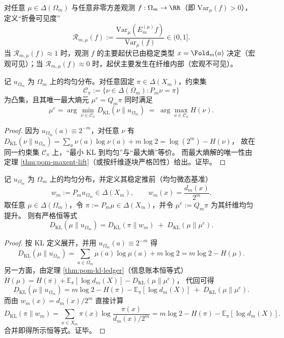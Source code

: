\begin{definition}\label{def:pom-fold-visibility}
对任意 $\mu\in\Delta(\Omega_m)$ 与任意非零方差观测 $f:\Omega_m\to\RR$（即 $\mathrm{Var}_\mu(f)>0$），定义“折叠可见度”
\[
\mathcal{R}_{m,\mu}(f):=\frac{\mathrm{Var}_\mu(E_m^{(\mu)}f)}{\mathrm{Var}_\mu(f)}\in(0,1].
\]
当 $\mathcal{R}_{m,\mu}(f)\approx 1$ 时，观测 $f$ 的主要起伏已由稳定类型 $x=\Fold_m(a)$ 决定（宏观可见）；当 $\mathcal{R}_{m,\mu}(f)\approx 0$ 时，起伏主要发生在纤维内部（宏观不可见）。
\end{definition}

\begin{corollary}\label{cor:pom-Iproj-maxent}
记 $u_{\Omega_m}$ 为 $\Omega_m$ 上的均匀分布。对任意固定 $\pi\in\Delta(X_m)$，约束集
\[
\mathcal{C}_\pi:=\{\nu\in\Delta(\Omega_m):P_m\nu=\pi\}
\]
为凸集，且其唯一最大熵元 $\mu^e=Q_m\pi$ 同时满足
\[
\boxed{\;
\mu^e=\arg\min_{\nu\in\mathcal{C}_\pi}D_{\mathrm{KL}}(\nu\|u_{\Omega_m})
\;=\;
\arg\max_{\nu\in\mathcal{C}_\pi}H(\nu).
\;}
\]
\end{corollary}
\begin{proof}
因为 $u_{\Omega_m}(a)\equiv 2^{-m}$，对任意 $\nu$ 有
\(
D_{\mathrm{KL}}(\nu\|u_{\Omega_m})=\sum_a \nu(a)\log\nu(a)+m\log 2=\log(2^m)-H(\nu)
\)，
故在同一约束集 $\mathcal{C}_\pi$ 上，“最小 KL 到均匀”与“最大熵”等价。
而最大熵解的唯一性由定理 \ref{thm:pom-maxent-lift}（或按纤维逐块严格凹性）给出。证毕。
\end{proof}

\begin{theorem}\label{thm:pom-kl-pythagoras-uniform}
记 $u_{\Omega_m}$ 为 $\Omega_m$ 上的均匀分布，并定义其稳定推前（均匀微态基准）
\[
w_m:=P_m u_{\Omega_m}\in\Delta(X_m),\qquad
w_m(x)=\frac{d_m(x)}{2^m}.
\]
取任意 $\mu\in\Delta(\Omega_m)$，令 $\pi:=P_m\mu\in\Delta(X_m)$，并令 $\mu^e:=Q_m\pi$ 为其纤维均匀提升。
则有严格恒等式
\[
\boxed{\;
D_{\mathrm{KL}}(\mu\|u_{\Omega_m})
=D_{\mathrm{KL}}(\pi\|w_m)\;+\;D_{\mathrm{KL}}(\mu\|\mu^e).
\;}
\]
\end{theorem}
\begin{proof}
按 KL 定义展开，并用 $u_{\Omega_m}(a)\equiv 2^{-m}$ 得
\[
D_{\mathrm{KL}}(\mu\|u_{\Omega_m})
=\sum_{a\in\Omega_m}\mu(a)\log\mu(a)+m\log 2
=m\log 2-H(\mu).
\]
另一方面，由定理 \ref{thm:pom-kl-ledger}（信息账本恒等式）
\(
H(\mu)=H(\pi)+\mathbb{E}_\pi[\log d_m(X)]-D_{\mathrm{KL}}(\mu\|\mu^e)
\)，
代回可得
\[
D_{\mathrm{KL}}(\mu\|u_{\Omega_m})
=m\log 2-H(\pi)-\mathbb{E}_\pi[\log d_m(X)]\;+\;D_{\mathrm{KL}}(\mu\|\mu^e).
\]
而由 $w_m(x)=d_m(x)/2^m$ 直接计算
\[
D_{\mathrm{KL}}(\pi\|w_m)
=\sum_{x\in X_m}\pi(x)\log\frac{\pi(x)}{d_m(x)/2^m}
=m\log 2-H(\pi)-\mathbb{E}_\pi[\log d_m(X)].
\]
合并即得所示恒等式。证毕。
\end{proof}


